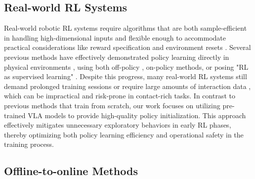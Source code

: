 \subsection{Real-world RL Systems}

Real-world robotic RL systems require algorithms that are both sample-efficient in handling high-dimensional inputs and flexible enough to accommodate practical considerations like reward specification and environment resets \cite{luo2024precise}. Several previous methods have effectively demonstrated policy learning directly in physical environments \cite{riedmiller2009reinforcement, johannink2019residual, luo2024serl, luo2024precise}, using both off-policy \cite{tony2022offline, luo2023rlif, hu2023reboot, russell2024continuously}, on-policy \cite{zhu2019dexterous, zhuang2023robot} methods, or posing "RL as supervised learning" \cite{mark2024policy, jan2007reinforcement}. Despite this progress, many real-world RL systems still demand prolonged training sessions or require large amounts of interaction data \cite{henery2020ingredients}, which can be impractical and risk-prone in contact-rich tasks. In contrast to previous methods that train from scratch, our work focuses on utilizing pre-trained VLA models to provide high-quality policy initialization. This approach effectively mitigates unnecessary exploratory behaviors in early RL phases, thereby optimizing both policy learning efficiency and operational safety in the training process.

\subsection{Offline-to-online Methods}

